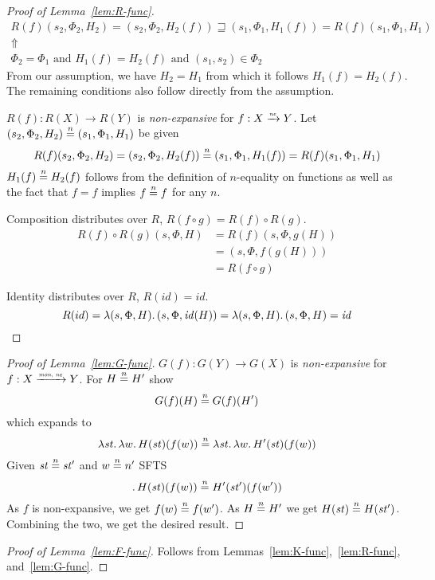 \documentclass{article}
\newcommand{\monnefun}{\xrightarrow{\textit{\tiny{mon, ne}}}}
\newcommand{\nefun}{\xrightarrow{\textit{\tiny{ne}}}}
\newcommand{\nequal}[1][n]{\stackrel{\tiny{#1}}{=}}
\newcommand{\id}{\var{id}}
\newcommand{\var}[1]{\mathit{#1}}
\newcommand{\future}{\mathbin{\sqsupseteq}}
\begin{document}
\begin{appendices}
\begin{proof}[Proof of Lemma~\ref{lem:R-func}]
    \begin{gather*}
      R(f)(s_2,\Phi_2,H_2) = (s_2,\Phi_2,H_2(f)) \future (s_1,\Phi_1,H_1(f)) = R(f)(s_1,\Phi_1,H_1) \\
      \Uparrow\\
      \Phi_2 = \Phi_1 \text{ and } H_1(f) = H_2(f) \text{ and } (s_1,s_2) \in \Phi_2
    \end{gather*}
    From our assumption, we have $H_2 = H_1$ from which it follows $H_1(f) = H_2(f)$. The remaining conditions also follow directly from the assumption.

    $R(f) : R(X) \rightarrow R(Y)$ is \emph{non-expansive} for $f : X \nefun Y$. Let $(s_2,\Phi_2,H_2) \nequal (s_1,\Phi_1,H_1)$ be given
\[
  R(f)(s_2,\Phi_2,H_2) = (s_2,\Phi_2,H_2(f)) \nequal (s_1,\Phi_1,H_1(f)) = R(f)(s_1,\Phi_1,H_1)
\]
$H_1(f) \nequal H_2(f)$ follows from the definition of $n$-equality on functions as well as the fact that $f=f$ implies $f \nequal f$ for any $n$.

  Composition distributes over $R$, $R(f \circ g) = R(f) \circ R(g)$.
  \begin{align*}
    R(f) \circ R(g)(s,\Phi,H) &= R(f)(s,\Phi,g(H)) \\
                              &= (s,\Phi,f(g(H)))\\
                              &= R(f \circ g)
  \end{align*}

  Identity distributes over $R$, $R(\id) = \id$.
  \[
    R(id) = \lambda (s,\Phi,H) \ldotp  (s,\Phi,\id(H)) = \lambda (s,\Phi,H) \ldotp  (s,\Phi,H) = \id
  \]
\end{proof}

\begin{proof}[Proof of Lemma~\ref{lem:G-func}]
  $G(f) : G(Y) \rightarrow G(X)$ is \emph{non-expansive} for $f : X \monnefun Y$. For $H \nequal H'$ show
  \[
    G(f)(H) \nequal G(f)(H')
  \]
  which expands to
  \[
    \lambda \var{st} \ldotp \lambda w \ldotp H(\var{st})(f(w)) \nequal \lambda \var{st} \ldotp \lambda w \ldotp  H'(\var{st})(f(w))
  \]
  Given $\var{st} \nequal \var{st}'$ and $w \nequal n'$ SFTS
  \[
  \ldotp H(\var{st})(f(w)) \nequal H'(\var{st}')(f(w'))
  \]
  As $f$ is non-expansive, we get $f(w) \nequal f(w')$. As $H \nequal H'$ we get $H(\var{st}) \nequal H(\var{st'})$. Combining the two, we get the desired result.  
\end{proof}

\begin{proof}[Proof of Lemma~\ref{lem:F-func}]
Follows from Lemmas~\ref{lem:K-func},~\ref{lem:R-func}, and~\ref{lem:G-func}.
\end{proof}


\end{appendices}
\end{document}
